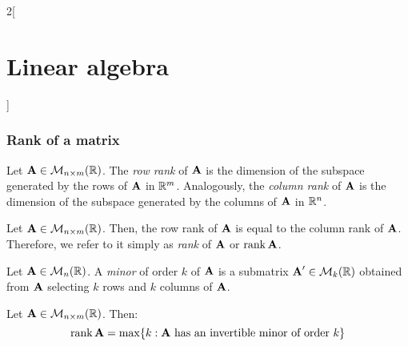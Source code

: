 \documentclass[../../../main.tex]{subfiles}
\begin{document}
\begin{multicols}{2}[\section{Linear algebra}]
  \subsubsection{Rank of a matrix}
  \begin{definition}
    Let $\boldsymbol{\mathrm{A}}\in\mathcal{M}_{n\times m}(\mathbb{R})$. The \emph{row rank} of $\boldsymbol{\mathrm{A}}$ is the dimension of the subspace generated by the rows of $\boldsymbol{\mathrm{A}}$ in $\mathbb{R}^m$. Analogously, the \emph{column rank} of $\boldsymbol{\mathrm{A}}$ is the dimension of the subspace generated by the columns of $\boldsymbol{\mathrm{A}}$ in $\mathbb{R}^n$.
  \end{definition}
  \begin{proposition}
    Let $\boldsymbol{\mathrm{A}}\in\mathcal{M}_{n\times m}(\mathbb{R})$. Then, the row rank of $\boldsymbol{\mathrm{A}}$ is equal to the column rank of $\boldsymbol{\mathrm{A}}$. Therefore, we refer to it simply as \emph{rank} of $\boldsymbol{\mathrm{A}}$ or $\rank\boldsymbol{\mathrm{A}}$.
  \end{proposition}
  \begin{definition}
    Let $\boldsymbol{\mathrm{A}}\in\mathcal{M}_n(\mathbb{R})$. A \emph{minor} of order $k$ of $\boldsymbol{\mathrm{A}}$ is a submatrix $\boldsymbol{\mathrm{A}}'\in\mathcal{M}_k(\mathbb{R})$ obtained from $\boldsymbol{\mathrm{A}}$ selecting $k$ rows and $k$ columns of $\boldsymbol{\mathrm{A}}$.
  \end{definition}
  \begin{proposition}
    Let $\boldsymbol{\mathrm{A}}\in\mathcal{M}_{n\times m}(\mathbb{R})$. Then:
    $$\rank\boldsymbol{\mathrm{A}}=\max\{k:\text{$\boldsymbol{\mathrm{A}}$\ has an invertible minor of order $k$}\}$$
  \end{proposition}

\end{multicols}
\end{document}
